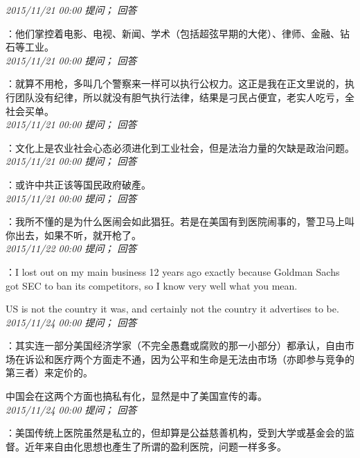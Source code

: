 \documentclass[twocolumn]{ctexart}
\begin{document}
\textit{\hfill\noindent\small 2015/11/21 00:00 提问； 回答}

：他们掌控着电影、电视、新闻、学术（包括超弦早期的大佬）、律师、金融、钻石等工业。\\

\textit{\hfill\noindent\small 2015/11/21 00:00 提问； 回答}

：就算不用枪，多叫几个警察来一样可以执行公权力。这正是我在正文里说的，执行团队没有纪律，所以就没有胆气执行法律，结果是刁民占便宜，老实人吃亏，全社会买单。\\

\textit{\hfill\noindent\small 2015/11/21 00:00 提问； 回答}

：文化上是农业社会心态必须进化到工业社会，但是法治力量的欠缺是政治问题。\\

\textit{\hfill\noindent\small 2015/11/21 00:00 提问； 回答}

：或许中共正该等国民政府破產。\\

\textit{\hfill\noindent\small 2015/11/21 00:00 提问； 回答}

：我所不懂的是为什么医闹会如此猖狂。若是在美国有到医院闹事的，警卫马上叫你出去，如果不听，就开枪了。\\

\textit{\hfill\noindent\small 2015/11/22 00:00 提问； 回答}

：I lost out on my main business 12 years ago exactly because Goldman Sachs got SEC to ban its competitors, so I know very well what you mean.

US is not the country it was, and certainly not the country it advertises to be.\\

\textit{\hfill\noindent\small 2015/11/24 00:00 提问； 回答}

：其实连一部分美国经济学家（不完全愚蠢或腐败的那一小部分）都承认，自由市场在诉讼和医疗两个方面走不通，因为公平和生命是无法由市场（亦即参与竞争的第三者）来定价的。

中国会在这两个方面也搞私有化，显然是中了美国宣传的毒。\\

\textit{\hfill\noindent\small 2015/11/24 00:00 提问； 回答}

：美国传统上医院虽然是私立的，但却算是公益慈善机构，受到大学或基金会的监督。近年来自由化思想也產生了所谓的盈利医院，问题一样多多。
\end{document}
